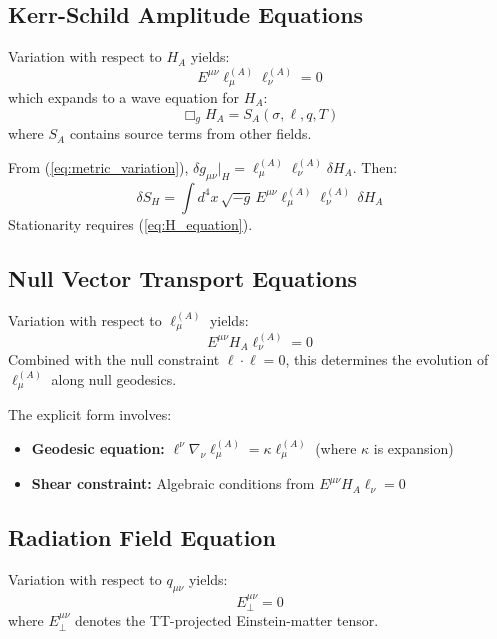 \documentclass[11pt,a4paper]{article}
\theoremstyle{definition}
\theoremstyle{remark}
\begin{document}
		\subsection{Kerr-Schild Amplitude Equations}
		
			Variation with respect to $H_A$ yields:
			\begin{equation}\label{eq:H_equation}
				\boxed{E^{\mu\nu}\ell_\mu^{(A)}\ell_\nu^{(A)} = 0}
			\end{equation}
			which expands to a wave equation for $H_A$:
			\begin{equation}
				\Box_g H_A = S_A(\sigma, \ell, q, T)
			\end{equation}
			where $S_A$ contains source terms from other fields.
		
			From (\ref{eq:metric_variation}), $\delta g_{\mu\nu}\big|_H = \ell_\mu^{(A)}\ell_\nu^{(A)}\delta H_A$. Then:
			\begin{equation}
				\delta S_H = \int d^4x\, \sqrt{-g}\, E^{\mu\nu}\ell_\mu^{(A)}\ell_\nu^{(A)}\, \delta H_A
			\end{equation}
			Stationarity requires (\ref{eq:H_equation}).
		
		\subsection{Null Vector Transport Equations}
		
			Variation with respect to $\ell_\mu^{(A)}$ yields:
			\begin{equation}\label{eq:ell_equation}
				\boxed{E^{\mu\nu}H_A\ell_\nu^{(A)} = 0}
			\end{equation}
			Combined with the null constraint $\ell \cdot \ell = 0$, this determines the evolution of $\ell_\mu^{(A)}$ along null geodesics.
		
		The explicit form involves:
		\begin{itemize}
			\item \textbf{Geodesic equation:} $\ell^\nu\nabla_\nu\ell_\mu^{(A)} = \kappa\ell_\mu^{(A)}$ (where $\kappa$ is expansion)
			\item \textbf{Shear constraint:} Algebraic conditions from $E^{\mu\nu}H_A\ell_\nu = 0$
		\end{itemize}
		
		\subsection{Radiation Field Equation}
		
			Variation with respect to $q_{\mu\nu}$ yields:
			\begin{equation}\label{eq:q_equation}
				\boxed{E_{\perp}^{\mu\nu} = 0}
			\end{equation}
			where $E_{\perp}^{\mu\nu}$ denotes the TT-projected Einstein-matter tensor.
		
\end{document}
